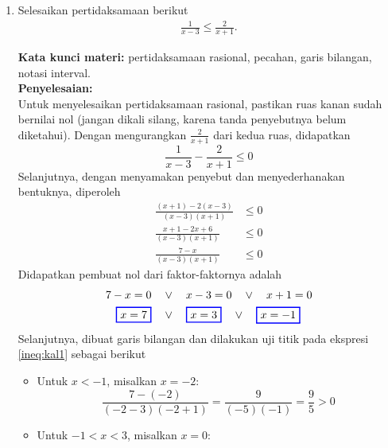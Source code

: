 \documentclass[10pt,openany,a4paper]{article}
\theoremstyle{definition}
\theoremstyle{definition}
\theoremstyle{plain}
\newenvironment{jawab}[2][tes]{%
\par\noindent\textbf{Kata kunci materi:} #1.\\
\textbf{Penyelesaian:} #2%
}{}
\begin{document}
\newpage

\begin{enumerate}
    \item Selesaikan pertidaksamaan berikut
    \begin{align*}
        \frac{1}{x-3}\leq\frac{2}{x+1}.
    \end{align*}
    \begin{jawab}[pertidaksamaan rasional, pecahan, garis bilangan, notasi interval]{~\\
        Untuk menyelesaikan pertidaksamaan rasional, pastikan ruas kanan sudah bernilai nol (jangan dikali silang, karena tanda penyebutnya belum diketahui). Dengan mengurangkan \(\frac{2}{x+1}\) dari kedua ruas, didapatkan
        \[
        \frac{1}{x-3} - \frac{2}{x+1} \leq 0
        \]
        Selanjutnya, dengan menyamakan penyebut dan menyederhanakan bentuknya, diperoleh
        \begin{align}
            \frac{(x+1)-2(x-3)}{(x-3)(x+1)} &\leq 0\nonumber\\
            \frac{x+1-2x+6}{(x-3)(x+1)} &\leq 0\nonumber \\
            \frac{7-x}{(x-3)(x+1)} &\leq 0 \label{ineq:kal1}
        \end{align}
        Didapatkan pembuat nol dari faktor-faktornya adalah
        \begin{align*}
            7-x = 0 \quad &\vee\quad  x-3 = 0 \quad\vee\quad x+1=0\\
            \colorlet{oldcolor}{.}
        \color{blue}
        \setlength{\fboxrule}{1pt} \boxed{\color{oldcolor}x=7}\color{oldcolor} \quad &\vee\quad \colorlet{oldcolor}{.}
        \color{blue}
        \setlength{\fboxrule}{1pt} \boxed{\color{oldcolor}x=3}\color{oldcolor} \quad\vee\quad \colorlet{oldcolor}{.}
        \color{blue}
        \setlength{\fboxrule}{1pt} \boxed{\color{oldcolor}x=-1}\color{oldcolor}
        \end{align*}
        Selanjutnya, dibuat garis bilangan dan dilakukan uji titik pada ekspresi \eqref{ineq:kal1} sebagai berikut
        \begin{itemize}
            \item Untuk \(x < -1\), misalkan \(x = -2\):
            \[
            \frac{7-(-2)}{(-2-3)(-2+1)} = \frac{9}{(-5)(-1)} = \frac{9}{5} > 0
            \]
            \item Untuk \(-1 < x < 3\), misalkan \(x = 0\):

\end{itemize}}
\end{jawab}
\end{enumerate}
\end{document}

